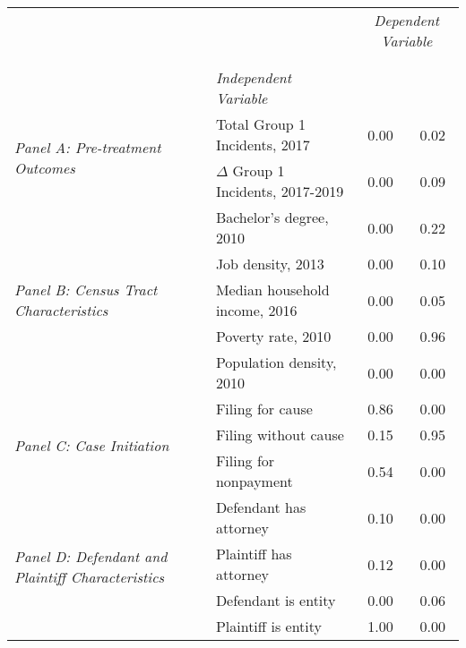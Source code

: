 \begin{tabular}{llcc}
\toprule
 &  & \multicolumn{2}{c}{\textit{Dependent Variable}} \\
\cline{3-4}
\\
 &  &  &  \\
 & \emph{Independent Variable} &  &  \\
\midrule
\multirow[c]{2}{3cm}{\textit{Panel A: Pre-treatment Outcomes}} & Total Group 1 Incidents, 2017 & 0.00 & 0.02 \\
 & $\Delta$ Group 1 Incidents, 2017-2019 & 0.00 & 0.09 \\
\cline{1-4}
\multirow[c]{5}{3cm}{\textit{Panel B: Census Tract Characteristics}} & Bachelor's degree, 2010 & 0.00 & 0.22 \\
 & Job density, 2013 & 0.00 & 0.10 \\
 & Median household income, 2016 & 0.00 & 0.05 \\
 & Poverty rate, 2010 & 0.00 & 0.96 \\
 & Population density, 2010 & 0.00 & 0.00 \\
\cline{1-4}
\multirow[c]{3}{3cm}{\textit{Panel C: Case Initiation}} & Filing for cause & 0.86 & 0.00 \\
 & Filing without cause & 0.15 & 0.95 \\
 & Filing for nonpayment & 0.54 & 0.00 \\
\cline{1-4}
\multirow[c]{4}{3cm}{\textit{Panel D: Defendant and Plaintiff Characteristics}} & Defendant has attorney & 0.10 & 0.00 \\
 & Plaintiff has attorney & 0.12 & 0.00 \\
 & Defendant is entity & 0.00 & 0.06 \\
 & Plaintiff is entity & 1.00 & 0.00 \\
\cline{1-4}
\bottomrule
\end{tabular}
